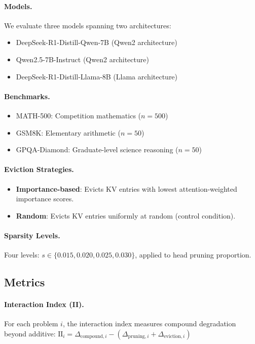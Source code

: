 \documentclass[11pt]{article}
\begin{document}
\paragraph{Models.}
We evaluate three models spanning two architectures:
\begin{itemize}
\item DeepSeek-R1-Distill-Qwen-7B (Qwen2 architecture)
\item Qwen2.5-7B-Instruct (Qwen2 architecture)
\item DeepSeek-R1-Distill-Llama-8B (Llama architecture)
\end{itemize}

\paragraph{Benchmarks.}
\begin{itemize}
\item MATH-500: Competition mathematics ($n=500$)
\item GSM8K: Elementary arithmetic ($n=50$)
\item GPQA-Diamond: Graduate-level science reasoning ($n=50$)
\end{itemize}

\paragraph{Eviction Strategies.}
\begin{itemize}
\item \textbf{Importance-based}: Evicts KV entries with lowest attention-weighted importance scores.
\item \textbf{Random}: Evicts KV entries uniformly at random (control condition).
\end{itemize}

\paragraph{Sparsity Levels.}
Four levels: $s \in \{0.015, 0.020, 0.025, 0.030\}$, applied to head pruning proportion.

\subsection{Metrics}

\paragraph{Interaction Index (II).}
For each problem $i$, the interaction index measures compound degradation beyond additive:
$\text{II}_i = \Delta_{\text{compound},i} - (\Delta_{\text{pruning},i} + \Delta_{\text{eviction},i})$
\end{document}
